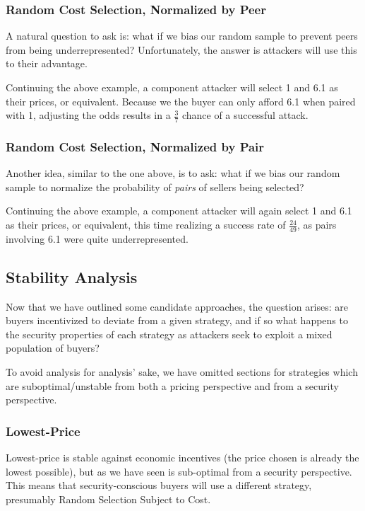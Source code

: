 \subsubsection{Random Cost Selection, Normalized by Peer}

A natural question to ask is: what if we bias our random sample to
prevent peers from being underrepresented? Unfortunately, the answer
is attackers will use this to their advantage.

Continuing the above example, a component attacker will select 1 and
6.1 as their prices, or equivalent. Because we the buyer can only
afford 6.1 when paired with 1, adjusting the odds results in a
$\frac{3}{7}$ chance of a successful attack.

\subsubsection{Random Cost Selection, Normalized by Pair}

Another idea, similar to the one above, is to ask: what if we bias our
random sample to normalize the probability of \emph{pairs} of sellers
being selected?

Continuing the above example, a component attacker will again select 1
and 6.1 as their prices, or equivalent, this time realizing a success
rate of $\frac{24}{49}$, as pairs involving 6.1 were quite
underrepresented.

\subsection{Stability Analysis}

Now that we have outlined some candidate approaches, the question
arises: are buyers incentivized to deviate from a given strategy, and
if so what happens to the security properties of each strategy as
attackers seek to exploit a mixed population of buyers?

To avoid analysis for analysis' sake, we have omitted sections for
strategies which are suboptimal/unstable from both a pricing
perspective and from a security perspective.

\subsubsection{Lowest-Price}

Lowest-price is stable against economic incentives (the price chosen
is already the lowest possible), but as we have seen is sub-optimal
from a security perspective. This means that security-conscious buyers
will use a different strategy, presumably Random Selection Subject to
Cost.

